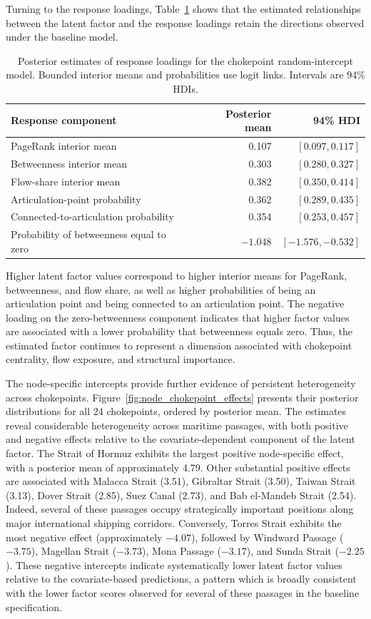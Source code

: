 \documentclass[pdftex,12pt,openright,a4paper,oneside]{book}
\begin{document}
Turning to the response loadings, Table~\ref{tab:node_chokepoint_loadings} shows that the estimated relationships between the latent factor and the response loadings retain
the directions observed under the baseline model.
\begin{table}[htbp]
\centering
\caption{Posterior estimates of response
loadings for the chokepoint random-intercept
model. Bounded interior means and
probabilities use logit links.
Intervals are 94\% HDIs.}
\label{tab:node_chokepoint_loadings}
\small
\begin{tabular}{lrr}
\hline
Response component & Posterior mean & 94\% HDI \\
\hline
PageRank interior mean
& 0.107 & $[0.097,0.117]$ \\
Betweenness interior mean
& 0.303 & $[0.280,0.327]$ \\
Flow-share interior mean
& 0.382 & $[0.350,0.414]$ \\
Articulation-point probability
& 0.362 & $[0.289,0.435]$ \\
Connected-to-articulation probability
& 0.354 & $[0.253,0.457]$ \\
Probability of betweenness equal to zero
& $-1.048$ & $[-1.576,-0.532]$ \\
\hline
\end{tabular}
\end{table}
Higher latent factor values correspond
to higher interior means for PageRank,
betweenness, and flow share, as well
as higher probabilities of being an
articulation point and being connected
to an articulation point.
The negative loading on the
zero-betweenness component indicates
that higher factor values are associated
with a lower probability that betweenness equals zero.
Thus, the estimated factor continues
to represent a dimension associated
with chokepoint centrality, flow
exposure, and structural importance.

The node-specific intercepts provide further evidence of persistent heterogeneity across chokepoints. 
Figure~\ref{fig:node_chokepoint_effects} presents their posterior distributions for all 24 chokepoints, ordered by posterior mean.
The estimates reveal considerable heterogeneity across maritime passages, with both positive and negative effects 
relative to the covariate-dependent component of the latent factor.
The Strait of Hormuz exhibits the largest positive node-specific effect, with a posterior mean of approximately 4.79. 
Other substantial positive effects are associated with Malacca Strait (3.51), Gibraltar Strait (3.50), Taiwan Strait (3.13), 
Dover Strait (2.85), Suez Canal (2.73), and Bab el-Mandeb Strait (2.54). Indeed, several of these passages occupy strategically 
important positions along major international shipping corridors. 
Conversely, Torres Strait exhibits the most negative effect (approximately $-4.07$), followed by Windward Passage ($-3.75$), 
Magellan Strait ($-3.73$), Mona Passage ($-3.17$), and Sunda Strait ($-2.25$). These negative intercepts indicate systematically 
lower latent factor values relative to the covariate-based predictions, a pattern which is broadly consistent with the lower factor 
scores observed for several of these passages in the baseline specification.
\end{document}
